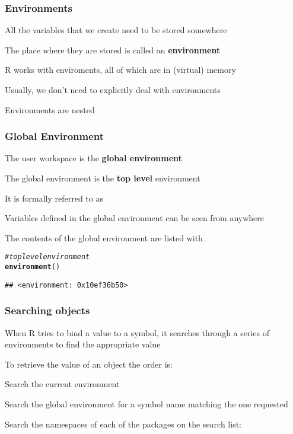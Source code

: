 \documentclass[12pt]{beamer}\usepackage[]{graphicx}\usepackage[]{color}
\makeatletter
\newcommand{\hlcom}[1]{\textcolor[rgb]{0.678,0.584,0.686}{\textit{#1}}}%
\newcommand{\hlstd}[1]{\textcolor[rgb]{0.345,0.345,0.345}{#1}}%
\newcommand{\hlkwd}[1]{\textcolor[rgb]{0.737,0.353,0.396}{\textbf{#1}}}%
\newenvironment{kframe}{%
 \def\at@end@of@kframe{}%
 \ifinner\ifhmode%
  \def\at@end@of@kframe{\end{minipage}}%
  \begin{minipage}{\columnwidth}%
 \fi\fi%
 \def\FrameCommand##1{\hskip\@totalleftmargin \hskip-\fboxsep
 \colorbox{shadecolor}{##1}\hskip-\fboxsep
     \hskip-\linewidth \hskip-\@totalleftmargin \hskip\columnwidth}%
 \MakeFramed {\advance\hsize-\width
   \@totalleftmargin\z@ \linewidth\hsize
   \@setminipage}}%
 {\par\unskip\endMakeFramed%
 \at@end@of@kframe}
\newenvironment{knitrout}{}{} %
\makeatother
\begin{document}

\begin{frame}
\frametitle{Environments}

\bbi
  \item All the variables that we create need to be stored somewhere
  \item The place where they are stored is called an \textbf{environment}
  \item R works with enviroments, all of which are in (virtual) memory
  \item Usually, we don't need to explicitly deal with environments
  \item Environments are nested
\ei

\end{frame}


\begin{frame}[fragile]
\frametitle{Global Environment}

\bi
  \item The user workspace is the \textbf{global environment}
  \item The global environment is the \textbf{top level} environment
  \item It is formally referred to as 
  \item Variables defined in the global environment can be seen from anywhere
  \item The contents of the global environment are listed with 
\ei

\begin{knitrout}\footnotesize
{}\color{fgcolor}\begin{kframe}
\begin{alltt}
\hlcom{# top level environment}
\hlkwd{environment}\hlstd{()}
\end{alltt}
\begin{verbatim}
## <environment: 0x10ef36b50>
\end{verbatim}
\end{kframe}
\end{knitrout}

\end{frame}


\begin{frame}
\frametitle{Searching objects}

\bi
  \item When R tries to bind a value to a symbol, it searches through a series of environments to find the appropriate value
  \item To retrieve the value of an object the order is:
  \item Search the current environment
  \item Search the global environment for a symbol name matching the one requested
  \item Search the namespaces of each of the packages on the search list: {\hilit {}}
\ei

\end{frame}
\end{document}
